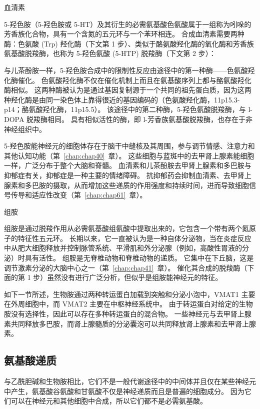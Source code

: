 血清素

5-羟色胺（5-羟色胺或 5-HT）及其衍生的必需氨基酸色氨酸属于一组称为吲哚的芳香族化合物，具有一个含氮的五元环与一个苯环相连。
合成血清素需要两种酶：色氨酸 (Trp) 羟化酶（下文第 1 步）、类似于酪氨酸羟化酶的氧化酶和芳香族氨基酸脱羧酶，也称为 5-羟色氨酸 (5-HTP) 脱羧酶（下文第 2 步）：


与儿茶酚胺一样，5-羟色胺合成中的限制性反应由途径中的第一种酶——色氨酸羟化酶催化。
色氨酸羟化酶不仅在催化机制上而且在氨基酸序列上都与酪氨酸羟化酶相似。
这两种酶被认为是通过基因复制源于一个共同的祖先蛋白质，因为这两种羟化酶是由同一染色体上靠得很近的基因编码的（色氨酸羟化酶，11p15.3-p14；酪氨酸羟化酶，11p15.5）。
该途径中的第二种酶，5-羟色氨酸脱羧酶，与 l-DOPA 脱羧酶相同。
具有相似活性的酶，即 l-芳香族氨基酸脱羧酶，也存在于非神经组织中。


5-羟色胺能神经元的细胞体存在于脑干中缝核及其周围，参与调节情感、注意力和其他认知功能（第~\ref{chap:chap40}~章）。
这些细胞与蓝斑中的去甲肾上腺素能细胞一样，广泛分布于整个大脑和脊髓。
血清素和儿茶酚胺去甲肾上腺素和多巴胺与抑郁症有关，抑郁症是一种主要的情绪障碍。
抗抑郁药会抑制血清素、去甲肾上腺素和多巴胺的摄取，从而增加这些递质的作用强度和持续时间，进而导致细胞信号传导和适应性改变（第~\ref{chap:chap61}~章）。


组胺

组胺是通过脱羧作用从必需氨基酸组氨酸中提取出来的，它包含一个带有两个氮原子的特征性五元环。
长期以来，它一直被认为是一种自体分泌物，当在炎症反应中从肥大细胞释放并控制脉管系统、平滑肌和外分泌腺（例如，高酸性胃液的分泌）时具有活性。
组胺是无脊椎动物和脊椎动物的递质。 它集中在下丘脑，这是调节激素分泌的大脑中心之一（第~\ref{chap:chap41}~章）。
催化其合成的脱羧酶（下面的第 1 步）虽然没有进行广泛分析，但似乎是组胺能神经元的特征。


如下一节所述，生物胺通过两种转运蛋白加载到突触和分泌小泡中，VMAT1 主要在外周细胞中，而 VMAT2 主要在中枢神经系统中。
由于转运蛋白对给定的生物胺没有选择性，因此可以存在多种转运蛋白的混合物。
一些神经元与去甲肾上腺素共同释放多巴胺，而肾上腺髓质的分泌囊泡可以共同释放肾上腺素和去甲肾上腺素。



\subsection{氨基酸递质}

与乙酰胆碱和生物胺相比，它们不是一般代谢途径中的中间体并且仅在某些神经元中产生，氨基酸谷氨酸和甘氨酸不仅是神经递质而且是普遍的细胞成分。
因为它们可以在神经元和其他细胞中合成，所以它们都不是必需氨基酸。


